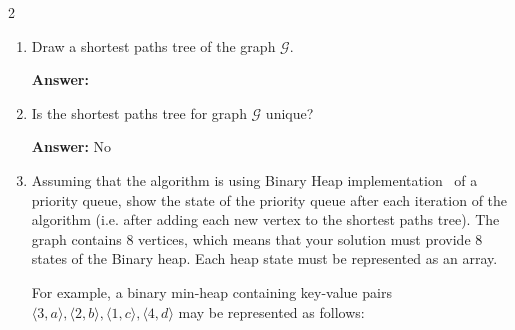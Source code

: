 \documentclass[dvipsnames]{article}
\begin{document}
\begin{enumerate}
\begin{multicols}{2}
\end{multicols}

  \begin{enumerate}
    \item Draw a shortest paths tree of the graph $\mathcal{G}$.

    \color{blue}
    \textbf{Answer:}
    \begin{center}
      \end{center}
    \color{black}

    \item Is the shortest paths tree for graph $\mathcal{G}$ unique?

    \color{blue}
    \textbf{Answer:} No
    \color{black}

    \item
    Assuming that the algorithm is using Binary Heap implementation~\cite[\S 6]{Cormen2022} of a priority queue,
    show the state of the priority queue after each iteration of the algorithm (i.e. after adding each new vertex to the shortest paths tree).
    The graph contains 8 vertices, which means that your solution must provide 8 states of the Binary heap.
    Each heap state must be represented as an array.

    For example, a binary min-heap containing key-value pairs $\langle 3, a\rangle, \langle 2, b\rangle, \langle 1, c\rangle, \langle 4, d\rangle$
    may be represented as follows:


\end{enumerate}
\end{enumerate}
\end{document}
